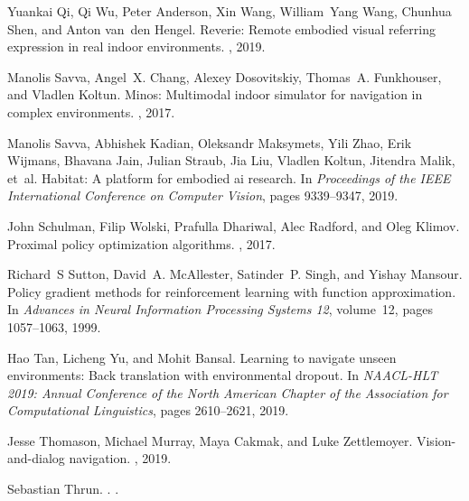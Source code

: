 \documentclass[final]{cvpr}
\begin{document}
\begin{thebibliography}{10}
    Yuankai {Qi}, Qi {Wu}, Peter {Anderson}, Xin {Wang}, William~Yang {Wang},
      Chunhua {Shen}, and Anton van~den {Hengel}.
    \newblock Reverie: Remote embodied visual referring expression in real indoor
      environments.
    , 2019.
    
    Manolis {Savva}, Angel~X. {Chang}, Alexey {Dosovitskiy}, Thomas~A.
      {Funkhouser}, and Vladlen {Koltun}.
    \newblock Minos: Multimodal indoor simulator for navigation in complex
      environments.
    , 2017.
    
    Manolis Savva, Abhishek Kadian, Oleksandr Maksymets, Yili Zhao, Erik Wijmans,
      Bhavana Jain, Julian Straub, Jia Liu, Vladlen Koltun, Jitendra Malik, et~al.
    \newblock Habitat: A platform for embodied ai research.
    \newblock In {\em Proceedings of the IEEE International Conference on Computer
      Vision}, pages 9339--9347, 2019.
    
    John {Schulman}, Filip {Wolski}, Prafulla {Dhariwal}, Alec {Radford}, and Oleg
      {Klimov}.
    \newblock Proximal policy optimization algorithms.
    , 2017.
    
    Richard~S {Sutton}, David~A. {McAllester}, Satinder~P. {Singh}, and Yishay
      {Mansour}.
    \newblock Policy gradient methods for reinforcement learning with function
      approximation.
    \newblock In {\em Advances in Neural Information Processing Systems 12},
      volume~12, pages 1057--1063, 1999.
    
    Hao {Tan}, Licheng {Yu}, and Mohit {Bansal}.
    \newblock Learning to navigate unseen environments: Back translation with
      environmental dropout.
    \newblock In {\em NAACL-HLT 2019: Annual Conference of the North American
      Chapter of the Association for Computational Linguistics}, pages 2610--2621,
      2019.
    
    Jesse Thomason, Michael Murray, Maya Cakmak, and Luke Zettlemoyer.
    \newblock Vision-and-dialog navigation.
    , 2019.
    
    Sebastian {Thrun}.
    .
    .
    

\end{thebibliography}
\end{document}
